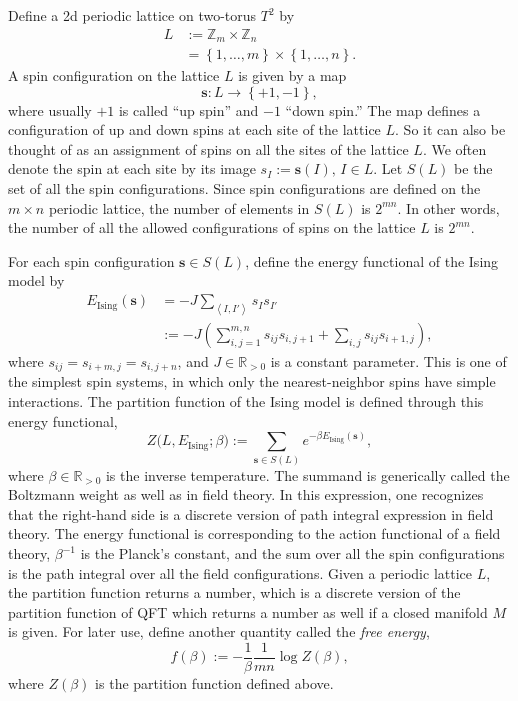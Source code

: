 Define a 2d periodic lattice on two-torus $T^{2}$ by
\begin{align}
L
  & :=  \mathbb{Z}_{m}\times\mathbb{Z}_{n}  \nonumber \\
  & =   \left\{ 1,\ldots,m\right\} \times\left\{ 1,\ldots,n\right\} .
\end{align}
A spin configuration on the lattice $L$ is given by a map
\begin{equation}
  \mathbf{s}  :  L  \longrightarrow  \left\{ +1,-1\right\} ,
\end{equation}
where usually $+1$ is called ``up spin'' and $-1$ ``down spin.'' The
map defines a configuration of up and down spins at each site of the lattice $L$. So it
can also be thought of as an assignment of spins on all the
sites of the lattice $L$. We often denote the spin at each site by
its image $s_{I} := \mathbf{s}(I),\,I\in L$. Let $S(L)$
be the set of all the spin configurations. Since spin configurations
are defined on the $m\times n$ periodic lattice, the number of elements
in $S(L)$ is $2^{mn}$. In other words, the number of
all the allowed configurations of spins on the lattice $L$ is $2^{mn}$.

For each spin configuration $\mathbf{s}\in S(L)$, define
the energy functional of the Ising model by
\begin{align}
  E_{\mathrm{Ising}}(\mathbf{s})
  & =   -J  \sum_{\left\langle I,I'\right\rangle } s_{I}s_{I'}  \nonumber \\
  & :=  -J  \left( \sum_{i,j=1}^{m,n}s_{ij}s_{i,j+1}+\sum_{i,j}s_{ij}s_{i+1,j} \right),
\end{align}
where $s_{ij}=s_{i+m,j}=s_{i,j+n}$, and $J\in\mathbb{R}_{>0}$
is a constant parameter. This is one of the simplest spin systems,
in which only the nearest-neighbor spins have simple interactions.
The partition function of the Ising model is defined through this energy functional,
\begin{equation}
  Z\big(L,E_{\mathrm{Ising}};\beta\big)
    :=  \sum_{\mathbf{s}\in S(L)}  e^{-\beta E_{\mathrm{Ising}}(\mathbf{s})},
\end{equation}
where $\beta\in\mathbb{R}_{>0}$ is the inverse temperature. The
summand is generically called the Boltzmann weight as well as in field
theory. In this expression, one recognizes that the right-hand side
is a discrete version of path integral expression in field theory.
The energy functional is corresponding to the action functional of
a field theory, $\beta^{-1}$ is the Planck's constant, and the sum
over all the spin configurations is the path integral over all the
field configurations. Given a periodic lattice $L$, the partition
function returns a number, which is a discrete version of the partition
function of QFT which returns a number as well if a closed manifold
$M$ is given. For later use, define another quantity called the \emph{free energy},
\begin{equation}
  f(\beta)  :=  -\frac{1}{\beta}\frac{1}{mn}\log Z(\beta),
\end{equation}
where $Z(\beta)$ is the partition function defined above.

